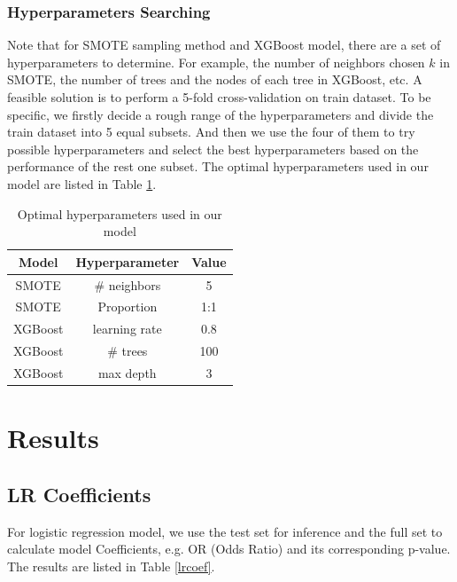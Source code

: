 \documentclass[11pt]{article}
\begin{document}
\subsubsection{Hyperparameters Searching}
Note that for SMOTE sampling method and XGBoost model, there are a set of hyperparameters to determine. For example, the number of neighbors chosen $k$ in SMOTE, the number of trees and the nodes of each tree in XGBoost, etc. A feasible solution is to perform a 5-fold cross-validation on train dataset. To be specific, we firstly decide a rough range of the hyperparameters and divide the train dataset into 5 equal subsets. And then we use the four of them to try possible hyperparameters and select the best hyperparameters based on the performance of the rest one subset. The optimal hyperparameters used in our model are listed in Table \ref{hyp}.

\begin{table}[h]
\caption{Optimal hyperparameters used in our model}
\centering
\begin{tabular}{c c c}
\hline
Model & Hyperparameter & Value \\
\hline
SMOTE & \# neighbors & 5\\
SMOTE & Proportion & 1:1\\
XGBoost & learning rate & 0.8 \\
XGBoost & \# trees & 100 \\
XGBoost & max depth & 3 \\
\hline
\end{tabular}
\label{hyp}
\end{table}

\section{Results}
\subsection{LR Coefficients}
For logistic regression model, we use the test set for inference and the full set to calculate model Coefficients, e.g. OR (Odds Ratio) and its corresponding p-value. The results are listed in Table \ref{lrcoef}.
\end{document}
